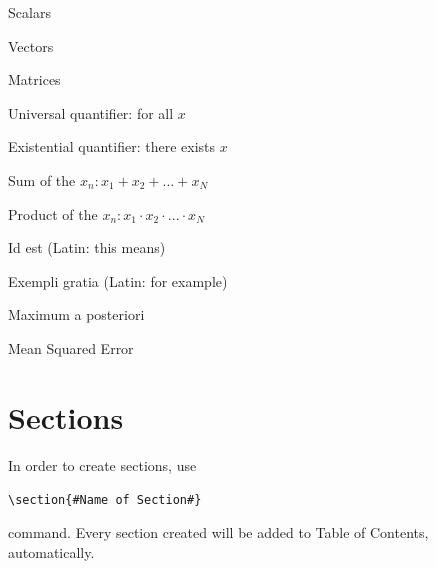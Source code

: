 \documentclass[a4paper,12pt]{article}
\newcommand{\writecommand}[2]{
    \begin{center}
        \texttt{\textbackslash #1\{\##2\#\}} \\
    \end{center}
}
\begin{document}
%
%
\maketitle

\makeabstract

\maketableofcontents

\makelistoffigures

\makelistoftables


%
%
\makelistofsymbols
\begin{symbols}
    \item[$a, b, c$] Scalars
    \item[$\boldsymbol{x, y, z}$] Vectors
    \item[$\boldsymbol{A, B, C}$] Matrices
    \item[$\forall x$] Universal quantifier: for all $x$
    \item[$\exists x$] Existential quantifier: there exists $x$
    \item[$\sum_{n=1}^{N} x_n$] Sum of the $x_n : x_1 + x_2 + ... + x_N$ 
    \item[$\prod_{n=1}^{N} x_n$] Product of the $x_n : x_1 \cdot x_2 \cdot ... \cdot x_N$ 
\end{symbols}

\newpage

\makelistofabbrv
\begin{abbrv}
    \item[i.e.] Id est (Latin: this means)
    \item[e.g.] Exempli gratia (Latin: for example)
    \item[MAP] Maximum a posteriori
    \item[MSE] Mean Squared Error
\end{abbrv}
\newpage

\setcounter{page}{1} %


%
%

\section{Sections}
In order to create sections, use \writecommand{section}{Name of Section} command. Every section created will be added to Table of Contents, automatically. 
\end{document}
